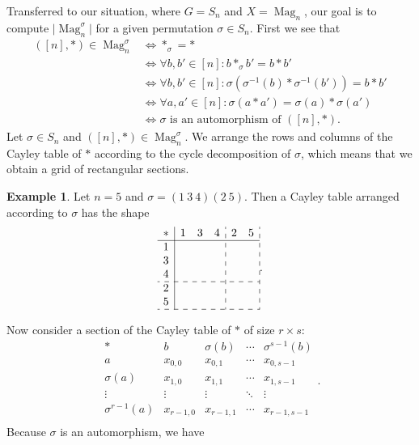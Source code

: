 \documentclass[12pt]{article}
\DeclareMathOperator{\Mag}{Mag}
\theoremstyle{definition}
\newtheorem{example}[theorem]{Example}
\theoremstyle{remark}
\begin{document}
	Transferred to our situation, where $G = S_n$ and $X = \Mag_n$, our goal is to compute $\lvert\Mag_n^\sigma\rvert$ for a given permutation $\sigma \in S_n$. First we see that
	\begin{align*}
		([n],\ast) \in \Mag_n^\sigma &\iff \ast_\sigma = \ast \\&\iff \forall b,b' \in [n] \colon b \ast_\sigma b' = b \ast b'  \\ &\iff \forall b,b' \in [n] \colon \sigma(\sigma^{-1}(b)\ast\sigma^{-1}(b')) = b \ast b'  \\ &\iff \forall a,a' \in [n] \colon \sigma(a\ast a') = \sigma(a) \ast \sigma(a') \\ &\iff \sigma \text{ is an automorphism of }([n],\ast).
	\end{align*}
	Let $\sigma \in S_n$ and $([n],\ast)\in \Mag_n^\sigma$. We arrange the rows and columns of the Cayley table of $\ast$ according to the cycle decomposition of $\sigma$, which means that we obtain a grid of rectangular sections.
	\begin{example}
		Let $n=5$ and $\sigma = (1\: 3\: 4)(2\: 5)$. Then a Cayley table arranged according to $\sigma$ has the shape
		\[
		\begin{array}{c|ccc:cc:}
			\ast & 1 & 3 & 4 & 2 & 5 \\ \hline
			1 & & & & & \\
			3 & & & & & \\
			4 & & & & & \\ \hdashline
			2 & & & & & \\
			5 & & & & & \\ \hdashline
		\end{array}.
		\]
	\end{example}
	Now consider a section of the Cayley table of $\ast$ of size $r \times s$:
	\begin{equation}\label{table_rs}
	\begin{array}{c|cccc}
		\ast  & b & \sigma(b) & \cdots & \sigma^{s-1}(b)  \\ \hline
		a  & x_{0,0} & x_{0,1} & \cdots & x_{0,s-1}  \\
		\sigma(a)  & x_{1,0} & x_{1,1} & \cdots & x_{1,s-1}  \\
		\vdots  & \vdots & \vdots & \ddots & \vdots  \\
		\sigma^{r-1}(a)  & x_{r-1,0} & x_{r-1,1} & \cdots & x_{r-1,s-1}  \\
	\end{array}.
	\end{equation}
	Because $\sigma$ is an automorphism, we have
\end{document}
